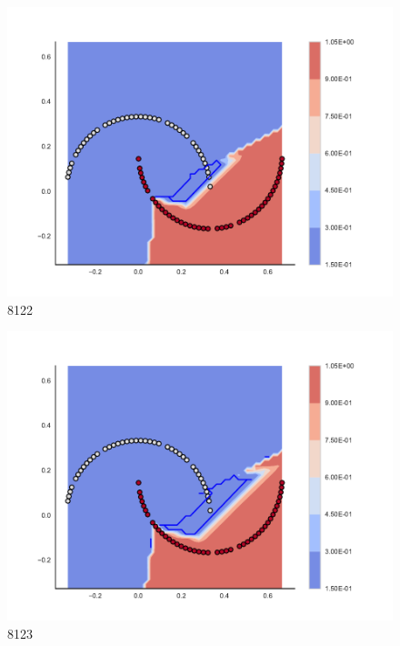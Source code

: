 \begin{subfigure}[b]{0.09\textwidth}
    \includegraphics[clip, trim=2.35cm 1.75cm 4.5cm 0cm,width=\textwidth]{img/convergence/8122.pdf}
    \caption{8122}
    \label{fig:convergence_8122}
\end{subfigure}
%
\begin{subfigure}[b]{0.09\textwidth}
    \includegraphics[clip, trim=2.35cm 1.75cm 4.5cm 0cm,width=\textwidth]{img/convergence/8123.pdf}
    \caption{8123}
    \label{fig:convergence_8123}
\end{subfigure}
%
